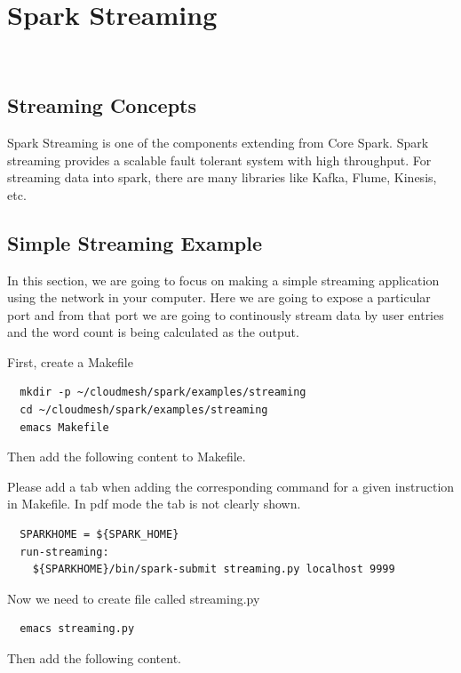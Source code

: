 \section{Spark Streaming}\label{s:spark-streaming}

\FILENAME\

\subsection{Streaming Concepts}

Spark Streaming is one of the components extending from Core Spark.
Spark streaming provides a scalable fault tolerant system with high
throughput. For streaming data into spark, there are many libraries
like Kafka, Flume, Kinesis, etc.

\subsection{Simple Streaming Example}

In this section, we are going to focus on making a simple streaming
application using the network in your computer. Here we are going to
expose a particular port and from that port we are going to
continously stream data by user entries and the word count is being
calculated as the output.

First, create a Makefile

\begin{lstlisting}
  mkdir -p ~/cloudmesh/spark/examples/streaming
  cd ~/cloudmesh/spark/examples/streaming
  emacs Makefile
\end{lstlisting}

Then add the following content to Makefile. 
\begin{NOTE}
  Please add a tab when adding the corresponding command for a given instruction
  in Makefile. In pdf mode the tab is not clearly shown. 
\end{NOTE}
\begin{lstlisting}
  SPARKHOME = ${SPARK_HOME}
  run-streaming:
	${SPARKHOME}/bin/spark-submit streaming.py localhost 9999
\end{lstlisting}
      
Now we need to create file called streaming.py

\begin{lstlisting}
  emacs streaming.py
\end{lstlisting}

Then add the following content. 

